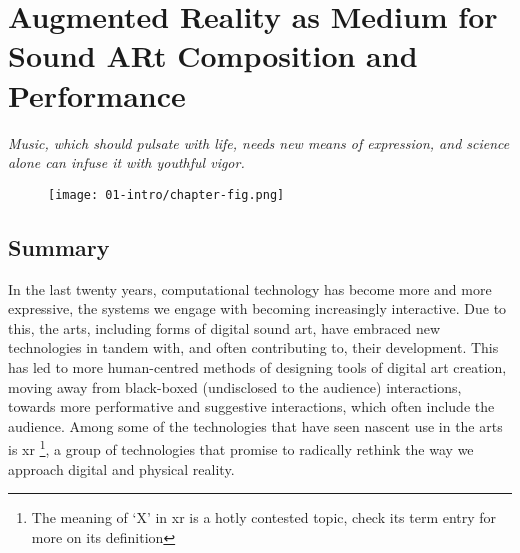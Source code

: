 \chapter{Augmented Reality as Medium for Sound ARt Composition and Performance}
\label{sec: introduction}
\epigraph{\emph{Music, which should pulsate with life, needs new means of expression, and science alone can infuse it with youthful vigor.}}{\citep{varese1966}}

\begin{figure}
    \centering
    \texttt{[image: 01-intro/chapter-fig.png]}
    \captionsetup{labelformat=empty}
    \caption[\autoref*{sec: introduction}'s page-figure: \textit{polygons\textasciitilde{}} in performance at the Attenborough Centre for Creative Arts, University of Sussex, on June 8th, (from \citeauthor{bilbow2022a}, \citeyear{bilbow2022a})]{}
\end{figure}

\clearpage
\section{Summary}\label{sec: introduction-summary}

In the last twenty years, computational technology has become more and more expressive, the systems we engage with becoming increasingly interactive. Due to this, the arts, including forms of digital sound art, have embraced new technologies in tandem with, and often contributing to, their development. This has led to more human-centred methods of designing tools of digital art creation, moving away from black-boxed (undisclosed to the audience) interactions, towards more performative and suggestive interactions, which often include the audience. Among some of the technologies that have seen nascent use in the arts is \gls{xr} \footnote{The meaning of `X' in \gls{xr} is a hotly contested topic, check its term entry for more on its definition}, a group of technologies that promise to radically rethink the way we approach digital and physical reality. 

